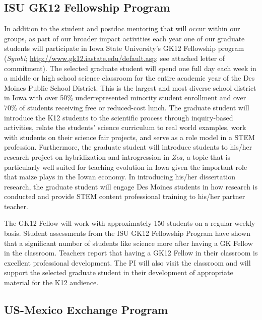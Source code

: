 \subsection*{ISU GK12 Fellowship Program}
	
In addition to the student and postdoc mentoring that will occur within our groups, as part of our broader impact activities each year one of our graduate students will participate in Iowa State University's GK12 Fellowship program (\emph{Symbi}; \url{http://www.gk12.iastate.edu/default.asp}; see attached letter of commitment). The selected graduate student will spend one full day each week in a middle or high school science classroom for the entire academic year of the Des Moines Public School District. This is the largest and most diverse school district in Iowa with over 50\% underrepresented minority student enrollment and over 70\% of students receiving free or reduced-cost lunch. The graduate student will introduce the K12 students to the scientific process through inquiry-based activities, relate the students’ science curriculum to real world examples, work with students on their science fair projects, and serve as a role model in a STEM profession. Furthermore, the graduate student will introduce students to his/her research project on hybridization and introgression in \emph{Zea}, a topic that is particularly well suited for teaching evolution in Iowa given the important role that maize plays in the Iowan economy. In introducing his/her dissertation research, the graduate student will engage Des Moines students in how research is conducted and provide STEM content professional training to his/her partner teacher.

The GK12 Fellow will work with approximately 150 students on a regular weekly basis.  Student assessments from the ISU GK12 Fellowship Program have shown that a significant number of students like science more after having a GK Fellow in the classroom.  Teachers report that having a GK12 Fellow in their classroom is excellent professional development.  The PI will also visit the classroom and will support the selected graduate student in their development of appropriate material for the K12 audience.

\subsection*{US-Mexico Exchange Program}
	
